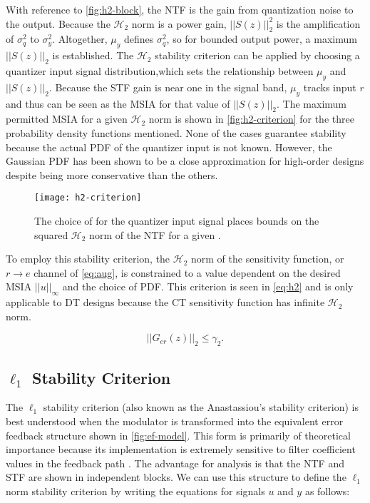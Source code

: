 With reference to \autoref{fig:h2-block}, the \gls{NTF} is the gain from quantization noise to the output. Because the $\mathcal{H}_2$ norm is a power gain, $||S(z)||_2^2$ is the amplification of $\sigma_q^2$ to $\sigma_y^2$. Altogether, $\mu_y$ defines $\sigma_q^2$, so for bounded output power, a maximum $||S(z)||_2$ is established. The $\mathcal{H}_2$ stability criterion can be applied by choosing a quantizer input signal distribution,which sets the relationship between $\mu_y$ and $||S(z)||_2$. Because the \gls{STF} gain is near one in the signal band, $\mu_y$ tracks input $r$ and thus can be seen as the \gls{MSIA} for that value of $||S(z)||_2$. The maximum permitted \gls{MSIA} for a given $\mathcal{H}_2$ norm is shown in \autoref{fig:h2-criterion} for the three probability density functions mentioned. None of the cases guarantee stability because the actual \gls{PDF} of the quantizer input is not known. However, the Gaussian \gls{PDF} has been shown to be a close approximation for high-order designs \cite{Risbo1994} despite being more conservative than the others. 

\begin{figure}
	\centering
	\texttt{[image: h2-criterion]}
	\caption{The choice of  for the quantizer input signal places bounds on the squared $\mathcal{H}_2$ norm of the \gls{NTF} for a given  \cite{Risbo1994}.} \label{fig:h2-criterion}
\end{figure}

To employ this stability criterion, the $\mathcal{H}_2$ norm of the sensitivity function, or $r \rightarrow e$ channel of \autoref{eq:aug}, is constrained to a value dependent on the desired \gls{MSIA} $||u||_\infty$ and the choice of \gls{PDF}. This criterion is seen in \autoref{eq:h2} and is only applicable to \gls{DT} designs because the \gls{CT} sensitivity function has infinite $\mathcal{H}_2$ norm.

\begin{equation}
	||G_{er}(z)||_2 \leq \gamma_2. \label{eq:h2}
\end{equation}
 
 \subsection{$\ell_1$ Stability Criterion}
 \label{sec:stab-l1}
 
The $\ell_1$ stability criterion (also known as the Anastassiou's stability criterion) is best understood when the modulator is transformed into the equivalent error feedback structure shown in \autoref{fig:ef-model}. This form is primarily of theoretical importance because its implementation is extremely sensitive to filter coefficient values in the feedback path \cite{Schreier1997}. The advantage for analysis is that the \gls{NTF} and \gls{STF} are shown in independent blocks. We can use this structure to define the $\ell_1$ norm stability criterion by writing the equations for signals $u$ and $y$ as follows:
 
